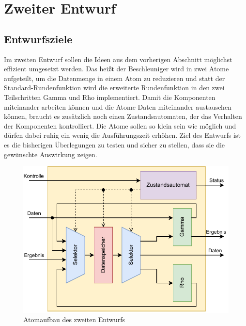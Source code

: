 \section{Zweiter Entwurf}

\subsection{Entwurfsziele}
Im zweiten Entwurf sollen die Ideen aus dem vorherigen Abschnitt möglichst effizient umgesetzt werden.
Das heißt der Beschleuniger wird in zwei Atome aufgeteilt, um die Datenmenge in einem Atom zu reduzieren
und statt der Standard-Rundenfunktion wird die erweiterte Rundenfunktion in den zwei Teilschritten Gamma und Rho implementiert.
Damit die Komponenten miteinander arbeiten können und die Atome Daten miteinander austauschen können, braucht es zusätzlich noch
einen Zustandsautomaten, der das Verhalten der Komponenten kontrolliert.
Die Atome sollen so klein sein wie möglich und dürfen dabei ruhig ein wenig die Ausführungszeit erhöhen.
Ziel des Entwurfs ist es die bisherigen Überlegungen zu testen und sicher zu stellen, dass sie die gewünschte Auswirkung zeigen.
\begin{figure}
	\center
	\includegraphics{images/Iteration_2.pdf}
	\caption{Atomaufbau des zweiten Entwurfs}
	\label{fig:aufbau_iteration_2}
\end{figure}
